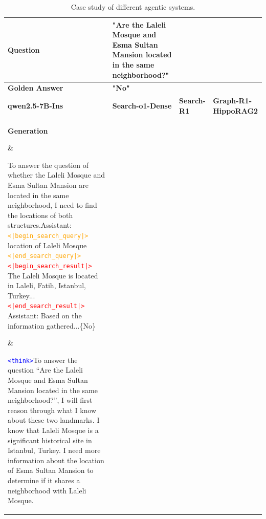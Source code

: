 \begin{table}[htbp]
\centering
\caption{Case study of different agentic systems.}
\label{tab:case}
\setlength{\tabcolsep}{10pt}       %
\renewcommand{\arraystretch}{1.35} %

{\scriptsize %
\begin{tabular}{|>{\centering\arraybackslash}m{1.5cm}|
                    >{\centering\arraybackslash}m{4cm}|
                    >{\centering\arraybackslash}m{4cm}|
                    >{\centering\arraybackslash}m{4cm}|}
\hline

\noalign{\renewcommand{\arraystretch}{0.675}}
\cellcolor{gray!20}\textbf{Question} &
\multicolumn{3}{>{\columncolor{gray!20}\centering\arraybackslash}m{\dimexpr 12cm + 4\tabcolsep\relax}|}
{\textbf{"Are the Laleli Mosque and Esma Sultan Mansion located in the same neighborhood?"}}\\
\hline

\cellcolor{gray!20}\textbf{Golden Answer} &
\multicolumn{3}{>{\columncolor{gray!20}\centering\arraybackslash}m{\dimexpr 12cm + 4\tabcolsep\relax}|}
{{\textbf{"No"}}}\\
\hline

\cellcolor{gray!20}\textbf{qwen2.5-7B-Ins} &
\cellcolor{gray!20}\textbf{Search-o1-Dense} &
\cellcolor{gray!20}\textbf{Search-R1} &
\cellcolor{gray!20}\textbf{Graph-R1-HippoRAG2} \\
\hline

\noalign{\renewcommand{\arraystretch}{1.35}}
\cellcolor{gray!20}\parbox[t][6cm][c]{1.5cm}{\centering\textbf{Generation}} &
\parbox[t][6cm][c]{4cm}{\centering
To answer the question of whether the Laleli Mosque and Esma Sultan Mansion are located in the same neighborhood, I need to find the locations of both structures.Assistant: \textcolor{orange}{\texttt{<|begin\_search\_query|>}} \\ location of Laleli Mosque
\textcolor{orange}{\texttt{<|end\_search\_query|>}}\\ \textcolor{red}{\texttt{<|begin\_search\_result|>}} The Laleli Mosque is located in Laleli, Fatih, Istanbul, Turkey...\textcolor{red}{\texttt{<|end\_search\_result|>}}\\
Assistant: Based on the information gathered...\{No\}

} &
\parbox[t][6cm][c]{4cm}{\centering
\textcolor{blue}{\texttt{<think>}}To answer the question ``Are the Laleli Mosque and Esma Sultan Mansion located in the same neighborhood?'',
I will first reason through what I know about these two landmarks.
I know that Laleli Mosque is a significant historical site in Istanbul, Turkey.
I need more information about the location of Esma Sultan Mansion to determine if it shares a neighborhood with Laleli Mosque.

}
\end{tabular}}
\end{table}

